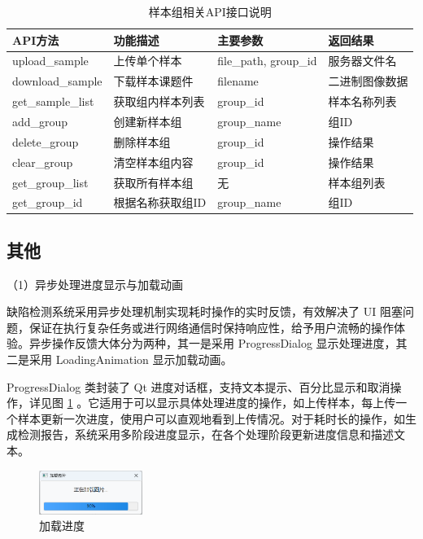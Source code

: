 \documentclass[
  ]{njuthesis}
\begin{document}
\begin{table}[H]
    \centering
    \caption{样本组相关API接口说明}
    \label{sample_API}
    \renewcommand\arraystretch{0.5}
    \begin{tabular}{p{2.5cm}p{3.5cm}p{4cm}p{2.5cm}}
    \toprule[1.5pt]
    API方法 & 功能描述 & 主要参数 & 返回结果 \\
    \midrule[1pt]
    upload\_sample & 上传单个样本 & file\_path, group\_id & 服务器文件名 \\
    \midrule[0.5pt]
    download\_sample & 下载样本课题件 & filename & 二进制图像数据 \\
    \midrule[0.5pt]
    get\_sample\_list & 获取组内样本列表 & group\_id & 样本名称列表 \\
    \midrule[0.5pt]
    add\_group & 创建新样本组 & group\_name & 组ID \\
    \midrule[0.5pt]
    delete\_group & 删除样本组 & group\_id & 操作结果 \\
    \midrule[0.5pt]
    clear\_group & 清空样本组内容 & group\_id & 操作结果 \\
    \midrule[0.5pt]
    get\_group\_list & 获取所有样本组 & 无 & 样本组列表 \\
    \midrule[0.5pt]
    get\_group\_id & 根据名称获取组ID & group\_name & 组ID \\
    \bottomrule[1.5pt]
    \end{tabular}
\end{table}


\subsection{其他}

（1）异步处理进度显示与加载动画

缺陷检测系统采用异步处理机制实现耗时操作的实时反馈，有效解决了 UI 阻塞问题，保证在执行复杂任务或进行网络通信时保持响应性，给予用户流畅的操作体验。异步操作反馈大体分为两种，其一是采用 ProgressDialog 显示处理进度，其二是采用 LoadingAnimation 显示加载动画。

ProgressDialog 类封装了 Qt 进度对话框，支持文本提示、百分比显示和取消操作，详见图 \ref{加载进度} 。它适用于可以显示具体处理进度的操作，如上传样本，每上传一个样本更新一次进度，使用户可以直观地看到上传情况。对于耗时长的操作，如生成检测报告，系统采用多阶段进度显示，在各个处理阶段更新进度信息和描述文本。

\begin{figure}[htb]
    \centering
    \includegraphics[width=0.3\textwidth]{images/加载进度.png}
    \caption{加载进度}
    \label{加载进度}
\end{figure}
\end{document}

